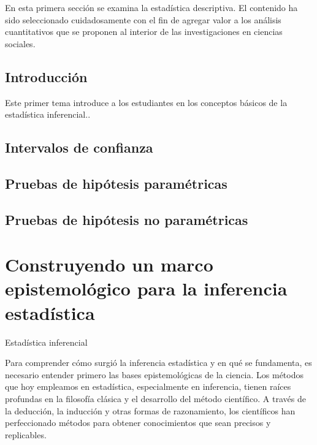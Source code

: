 \documentclass[
  letterpaper,
  DIV=11,
  numbers=noendperiod]{scrreprt}
\begin{document}
En esta primera sección se examina la estadística descriptiva. El
contenido ha sido seleccionado cuidadosamente con el fin de agregar
valor a los análisis cuantitativos que se proponen al interior de las
investigaciones en ciencias sociales.

\section*{Introducción}\label{introducciuxf3n-1}


Este primer tema introduce a los estudiantes en los conceptos básicos de
la estadística inferencial..

\section*{Intervalos de confianza}\label{intervalos-de-confianza}


\section*{Pruebas de hipótesis
paramétricas}\label{pruebas-de-hipuxf3tesis-paramuxe9tricas}


\section*{Pruebas de hipótesis no
paramétricas}\label{pruebas-de-hipuxf3tesis-no-paramuxe9tricas}


\chapter{Construyendo un marco epistemológico para la inferencia
estadística}\label{construyendo-un-marco-epistemoluxf3gico-para-la-inferencia-estaduxedstica}

Estadística inferencial

\hfill\break

Para comprender cómo surgió la inferencia estadística y en qué se
fundamenta, es necesario entender primero las bases epistemológicas de
la ciencia. Los métodos que hoy empleamos en estadística, especialmente
en inferencia, tienen raíces profundas en la filosofía clásica y el
desarrollo del método científico. A través de la deducción, la inducción
y otras formas de razonamiento, los científicos han perfeccionado
métodos para obtener conocimientos que sean precisos y replicables.
\end{document}
